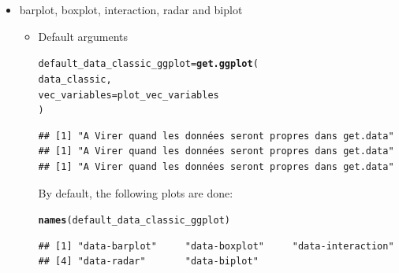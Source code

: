 \documentclass{article}\usepackage[]{graphicx}\usepackage[]{color}
\makeatletter
\newcommand{\hlstd}[1]{\textcolor[rgb]{0.345,0.345,0.345}{#1}}%
\newcommand{\hlkwb}[1]{\textcolor[rgb]{0.69,0.353,0.396}{#1}}%
\newcommand{\hlkwc}[1]{\textcolor[rgb]{0.333,0.667,0.333}{#1}}%
\newcommand{\hlkwd}[1]{\textcolor[rgb]{0.737,0.353,0.396}{\textbf{#1}}}%
\newenvironment{kframe}{%
 \def\at@end@of@kframe{}%
 \ifinner\ifhmode%
  \def\at@end@of@kframe{\end{minipage}}%
  \begin{minipage}{\columnwidth}%
 \fi\fi%
 \def\FrameCommand##1{\hskip\@totalleftmargin \hskip-\fboxsep
 \colorbox{shadecolor}{##1}\hskip-\fboxsep
     \hskip-\linewidth \hskip-\@totalleftmargin \hskip\columnwidth}%
 \MakeFramed {\advance\hsize-\width
   \@totalleftmargin\z@ \linewidth\hsize
   \@setminipage}}%
 {\par\unskip\endMakeFramed%
 \at@end@of@kframe}
\newenvironment{knitrout}{}{} %
\makeatother
\begin{document}
\begin{itemize}

\item barplot, boxplot, interaction, radar and biplot

\begin{itemize}

\item Default arguments
\begin{knitrout}
\color{fgcolor}\begin{kframe}
\begin{alltt}
\hlstd{default_data_classic_ggplot} \hlkwb{=} \hlkwd{get.ggplot}\hlstd{(}
        \hlstd{data_classic,}
        \hlkwc{vec_variables} \hlstd{= plot_vec_variables}
        \hlstd{)}
\end{alltt}


{\ttfamily\noindent\itshape\color{messagecolor}{\#\# As ggplot.type is NULL, ggplot.Type is set to data-barplot, data-boxplot, data-interaction, data-radar, data-biplot\\\#\# As x.axis and in.col are NULL, all the combinaisons of x.axis and in.col are done for data-barplot, data-boxplot and data-interaction.\\\#\# As in.col is NULL, each in.col are done for data-radar and data-biplot.}}\begin{verbatim}
## [1] "A Virer quand les données seront propres dans get.data"
## [1] "A Virer quand les données seront propres dans get.data"
## [1] "A Virer quand les données seront propres dans get.data"
\end{verbatim}


{\ttfamily\noindent\itshape{}}\end{kframe}
\end{knitrout}

By default, the following plots are done:
\begin{knitrout}
\color{fgcolor}\begin{kframe}
\begin{alltt}
\hlkwd{names}\hlstd{(default_data_classic_ggplot)}
\end{alltt}
\begin{verbatim}
## [1] "data-barplot"     "data-boxplot"     "data-interaction"
## [4] "data-radar"       "data-biplot"
\end{verbatim}
\end{kframe}
\end{knitrout}


\end{itemize}
\end{itemize}
\end{document}
